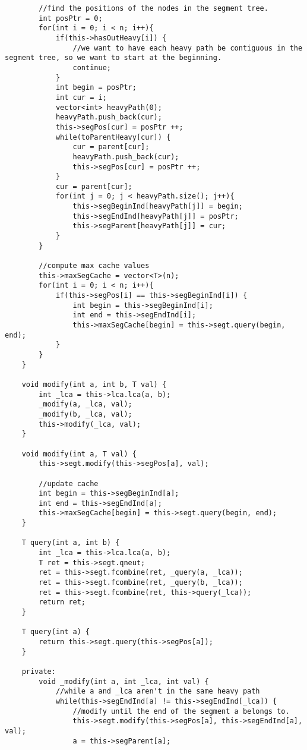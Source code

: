 \documentclass[8pt, headheight=10pt]{scrartcl}
\begin{document}
\begin{multicols*}{3}
\begin{lstlisting}
        //find the positions of the nodes in the segment tree. 
        int posPtr = 0;
        for(int i = 0; i < n; i++){
            if(this->hasOutHeavy[i]) {
                //we want to have each heavy path be contiguous in the segment tree, so we want to start at the beginning. 
                continue;
            }
            int begin = posPtr;
            int cur = i;
            vector<int> heavyPath(0);
            heavyPath.push_back(cur);
            this->segPos[cur] = posPtr ++;
            while(toParentHeavy[cur]) {
                cur = parent[cur];
                heavyPath.push_back(cur);
                this->segPos[cur] = posPtr ++;
            }
            cur = parent[cur];
            for(int j = 0; j < heavyPath.size(); j++){
                this->segBeginInd[heavyPath[j]] = begin;
                this->segEndInd[heavyPath[j]] = posPtr;
                this->segParent[heavyPath[j]] = cur;
            }
        }

        //compute max cache values
        this->maxSegCache = vector<T>(n);
        for(int i = 0; i < n; i++){
            if(this->segPos[i] == this->segBeginInd[i]) {
                int begin = this->segBeginInd[i];
                int end = this->segEndInd[i];
                this->maxSegCache[begin] = this->segt.query(begin, end);
            }
        }
    }

    void modify(int a, int b, T val) {
        int _lca = this->lca.lca(a, b);
        _modify(a, _lca, val);
        _modify(b, _lca, val);
        this->modify(_lca, val);
    }

    void modify(int a, T val) {
        this->segt.modify(this->segPos[a], val);

        //update cache
        int begin = this->segBeginInd[a];
        int end = this->segEndInd[a];
        this->maxSegCache[begin] = this->segt.query(begin, end);
    }

    T query(int a, int b) {
        int _lca = this->lca.lca(a, b);
        T ret = this->segt.qneut;
        ret = this->segt.fcombine(ret, _query(a, _lca));
        ret = this->segt.fcombine(ret, _query(b, _lca));
        ret = this->segt.fcombine(ret, this->query(_lca));
        return ret;
    }

    T query(int a) {
        return this->segt.query(this->segPos[a]);
    }

    private:
        void _modify(int a, int _lca, int val) {
            //while a and _lca aren't in the same heavy path
            while(this->segEndInd[a] != this->segEndInd[_lca]) {
                //modify until the end of the segment a belongs to. 
                this->segt.modify(this->segPos[a], this->segEndInd[a], val);
                a = this->segParent[a];


\end{lstlisting}
\end{multicols*}
\end{document}
